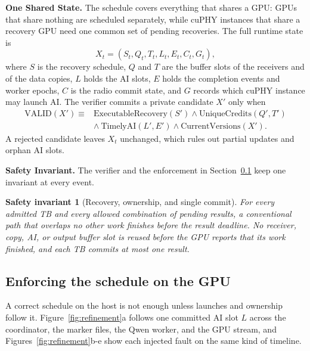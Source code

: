 \documentclass[acmsmall,screen,review,anonymous]{acmart}
\newtheorem{invariant}{Safety invariant}
\begin{document}
\noindent\textbf{One Shared State.}
The schedule covers everything that shares a GPU: GPUs that share nothing are scheduled separately,
while cuPHY instances that share a recovery GPU need one common set of pending recoveries. The full
runtime state is
\begin{equation}
 X_t=(S_t,Q_t,T_t,L_t,E_t,C_t,G_t),
\end{equation}
where $S$ is the recovery schedule, $Q$ and $T$ are the buffer slots of the receivers and of the data
copies, $L$ holds the AI slots, $E$ holds the completion events and worker epochs, $C$ is the radio commit
state, and $G$ records which cuPHY instance may launch AI. The verifier commits a private candidate $X'$
only when
\begin{align}
\mathrm{VALID}(X') \equiv {}& \mathrm{ExecutableRecovery}(S') \land
 \mathrm{UniqueCredits}(Q',T') \nonumber\\
 &\land\ \mathrm{TimelyAI}(L',E') \land \mathrm{CurrentVersions}(X').
\end{align}
A rejected candidate leaves $X_t$ unchanged, which rules out partial updates and orphan AI slots.

\noindent\textbf{Safety Invariant.}
The verifier and the enforcement in Section~\ref{sec:design-refinement} keep one invariant at every
event.
\begin{invariant}[Recovery, ownership, and single commit]
For every admitted TB and every allowed combination of pending results, a conventional path that
overlaps no other work finishes before the result deadline. No receiver, copy, AI, or output buffer slot
is reused before the GPU reports that its work finished, and each TB commits at most one result.
\end{invariant}

\subsection{Enforcing the schedule on the GPU}
\label{sec:design-refinement}

A correct schedule on the host is not enough unless launches and ownership follow it.
Figure~\ref{fig:refinement}a follows one committed AI slot $L$ across the coordinator, the marker files,
the Qwen worker, and the GPU stream, and Figures~\ref{fig:refinement}b-e show each injected fault on the
same kind of timeline.
\end{document}
